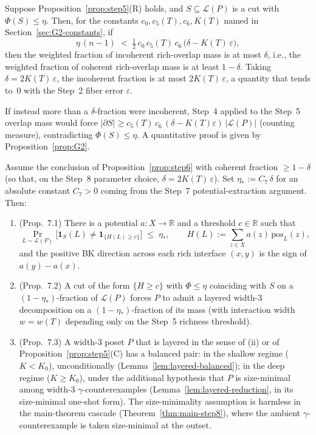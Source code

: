 \begin{proposition}\label{prop:step6}
Suppose Proposition~\ref{prop:step5}(R) holds, and $S \subseteq
\mathcal{L}(P)$ is a cut with $\Phi(S) \le \eta$. Then, for the constants
$c_0, c_5(T), c_6, K(T)$ named in Section~\ref{sec:G2-constants}, if
\[
  \eta\,(n-1) \;<\; \tfrac{1}{2}\, c_0\, c_5(T)\, c_6\,\big(\delta - K(T)\,\varepsilon\big),
\]
then the weighted fraction of incoherent rich-overlap mass is at most
$\delta$, i.e., the weighted fraction of coherent rich-overlap mass is
at least $1 - \delta$. Taking $\delta = 2 K(T)\,\varepsilon$, the
incoherent fraction is at most $2 K(T)\,\varepsilon$, a quantity that
tends to~$0$ with the Step~2 fiber error $\varepsilon$.
\end{proposition}

\noindent
If instead more than a $\delta$-fraction were incoherent, Step~4 applied
to the Step~5 overlap mass would force $|\partial S| \ge c_5(T)\,c_6\,
(\delta - K(T)\varepsilon)\,|\mathcal L(P)|$ (counting measure),
contradicting
$\Phi(S) \le \eta$. A quantitative proof is given by
Proposition~\ref{prop:G2}.

\begin{proposition}\label{prop:step7}
Assume the conclusion of Proposition~\ref{prop:step6} with coherent
fraction $\ge 1 - \delta$ (so that, on the Step~8 parameter choice,
$\delta = 2 K(T)\,\varepsilon$). Set $\eta_* := C_7\,\delta$ for an
absolute constant $C_7 > 0$ coming from the Step~7 potential-extraction
argument. Then:
\begin{enumerate}[nosep, label=(\roman*)]
 \item (Prop.~7.1) There is a potential $a\colon X \to \mathbb{R}$ and a
 threshold $c \in \mathbb{R}$ such that
 \[
   \Pr_{L \sim \mathcal L(P)}\!\big[\mathbf{1}_S(L) \ne
   \mathbf{1}_{\{H(L) \ge c\}}\big] \;\le\; \eta_*,
   \qquad
   H(L) := \sum_{z \in X} a(z)\,\mathrm{pos}_L(z),
 \]
 and the positive BK direction across each rich interface $(x,y)$ is
 the sign of $a(y) - a(x)$.
 \item (Prop.~7.2) A cut of the form $\{H \ge c\}$ with $\Phi \le \eta$
 coinciding with $S$ on a $(1-\eta_*)$-fraction of $\mathcal L(P)$
 forces $P$ to admit a layered width-$3$ decomposition on a
 $(1 - \eta_*)$-fraction of its mass (with interaction width $w = w(T)$
 depending only on the Step~5 richness threshold).
 \item (Prop.~7.3) A width-$3$ poset $P$ that is layered in the
 sense of (ii) or of Proposition~\ref{prop:step5}(C) has a balanced
 pair: in the shallow regime ($K < K_0$), unconditionally
 (Lemma~\ref{lem:layered-balanced}); in the deep regime ($K \ge
 K_0$), under the additional hypothesis that $P$ is size-minimal
 among width-$3$ $\gamma$-counterexamples
 (Lemma~\ref{lem:layered-reduction}, in its size-minimal one-shot
 form). The size-minimality assumption is harmless in the
 main-theorem cascade (Theorem~\ref{thm:main-step8}), where the
 ambient $\gamma$-counterexample is taken size-minimal at the
 outset.
\end{enumerate}
\end{proposition}


